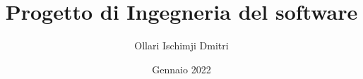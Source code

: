 \documentclass{article}
\begin{document}
    \author{Ollari Ischimji Dmitri}
    \title{Progetto di Ingegneria del software}
    \date{Gennaio 2022}

    \maketitle
    \tableofcontents

    \listoffigures
    \listoftables

    
\end{document}
